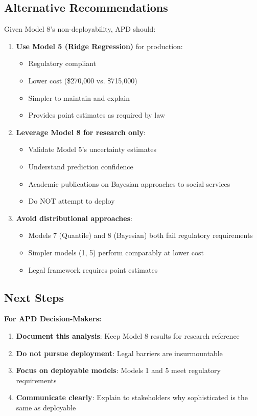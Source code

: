 \subsection{Alternative Recommendations}

Given Model 8's non-deployability, APD should:

\begin{enumerate}
    \item \textbf{Use Model 5 (Ridge Regression)} for production:
    \begin{itemize}
        \item Regulatory compliant 
        \item Lower cost (\$270,000 vs. \$715,000)
        \item Simpler to maintain and explain
        \item Provides point estimates as required by law
    \end{itemize}
    
    \item \textbf{Leverage Model 8 for research only}:
    \begin{itemize}
        \item Validate Model 5's uncertainty estimates
        \item Understand prediction confidence
        \item Academic publications on Bayesian approaches to social services
        \item Do NOT attempt to deploy
    \end{itemize}
    
    \item \textbf{Avoid distributional approaches}:
    \begin{itemize}
        \item Models 7 (Quantile) and 8 (Bayesian) both fail regulatory requirements
        \item Simpler models (1, 5) perform comparably at lower cost
        \item Legal framework requires point estimates
    \end{itemize}
\end{enumerate}

\subsection{Next Steps}

\textbf{For APD Decision-Makers:}

\begin{enumerate}
    \item \textbf{Document this analysis}: Keep Model 8 results for research reference
    \item \textbf{Do not pursue deployment}: Legal barriers are insurmountable
    \item \textbf{Focus on deployable models}: Models 1 and 5 meet regulatory requirements
    \item \textbf{Communicate clearly}: Explain to stakeholders why sophisticated is the same as deployable
\end{enumerate}

